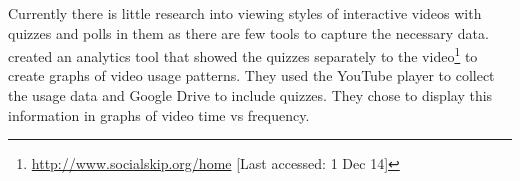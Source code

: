Currently there is little research into viewing styles of interactive videos with quizzes and polls in them as there are few tools to capture the necessary data.  created an analytics tool that showed the quizzes separately to the video\footnote{\url{http://www.socialskip.org/home} [Last accessed: 1 Dec 14]} to create graphs of video usage patterns. They used the YouTube player to collect the usage data and Google Drive to include quizzes. They chose to display this information in graphs of video time vs frequency.